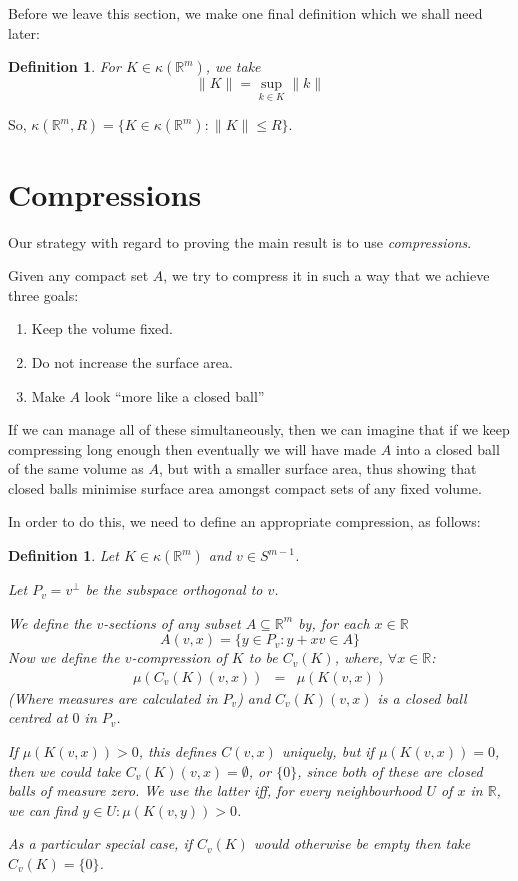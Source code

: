 \documentclass[a4paper,11pt]{article}
\newcommand{\bbR}{\mathbb{R}}
\newcommand{\lV}{\lVert}
\newcommand{\rV}{\rVert}
\newtheorem{defn}[thm]{Definition}
\begin{document}
Before we leave this section, we make one final definition which we shall need
later:

\begin{defn}
For $K\in\kappa(\bbR^m)$, we take
\[
\lV K\rV=\sup_{k\in K}\lV k\rV
\]
\end{defn}

So, $\kappa(\bbR^m,R)=\{K\in\kappa(\bbR^m):\lV K\rV\leq R\}$.

\section{Compressions}
Our strategy with regard to proving the main result is to use
\emph{compressions}.

Given any compact set $A$, we try to compress it in such a way that we achieve
three goals:
\begin{enumerate}
\item Keep the volume fixed.
\item Do not increase the surface area.
\item Make $A$ look ``more like a closed ball''
\end{enumerate}
If we can manage all of these simultaneously, then we can imagine that if we
keep compressing long enough then eventually we will have made $A$ into a
closed ball of the same volume as $A$, but with a smaller surface area, thus
showing that closed balls minimise surface area amongst compact sets of any
fixed volume.

In order to do this, we need to define an appropriate compression, as follows:

\begin{defn}
\label{defn:compression}
Let $K\in\kappa(\bbR^m)$ and $v\in S^{m-1}$.

Let $P_v=v^\perp$ be the subspace orthogonal to $v$.

We define the \emph{$v$-sections} of any subset $A\subseteq\bbR^m$ by,
for each $x\in\bbR$
\[
A(v,x)=\{y\in P_v:y+xv\in A\}
\]
Now we define the \emph{$v$-compression} of $K$ to be $C_v(K)$, where,
$\forall x\in\bbR$:
%
\begin{eqnarray*}
\mu(C_v(K)(v,x))&=&\mu(K(v,x))
\end{eqnarray*}
%
(Where measures are calculated in $P_v$)
and $C_v(K)(v,x)$ is a closed ball centred at $0$ in $P_v$.

If $\mu(K(v,x))>0$, this defines $C(v,x)$ uniquely, but if $\mu(K(v,x))=0$,
then we could take $C_v(K)(v,x)=\emptyset$, or $\{0\}$, since both of these are
closed balls of measure zero.  We use the latter iff, for every neighbourhood
$U$ of $x$ in $\bbR$, we can find $y\in U:\mu(K(v,y))>0$.

As a particular special case, if $C_v(K)$ would otherwise be empty then take
$C_v(K)=\{0\}$.
\end{defn}
\end{document}
